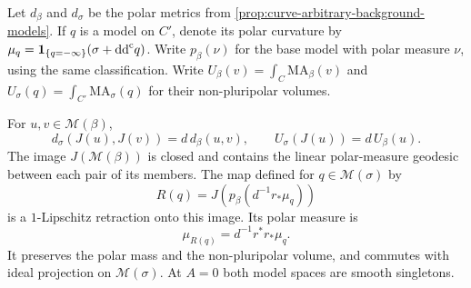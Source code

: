 Let $d_\beta$ and $d_\sigma$ be the polar metrics from
\cref{prop:curve-arbitrary-background-models}. If $q$ is a model
on $C'$, denote its polar curvature by
$\mu_q=\mathbf1_{\{q=-\infty\}}(\sigma+\mathrm{dd}^{\mathrm{c}} q)$.
Write $p_\beta(\nu)$ for the base model with polar measure
$\nu$, using the same classification.
Write $U_\beta(v)=\int_C\mathrm{MA}_\beta(v)$ and
$U_\sigma(q)=\int_{C'}\mathrm{MA}_\sigma(q)$ for their
non-pluripolar volumes.

\begin{proposition}\label{finite-curve:model-retraction}
For $u,v\in\mathcal M(\beta)$,
\[
 d_\sigma(J(u),J(v))=d\,d_\beta(u,v),\qquad
 U_\sigma(J(u))=d\,U_\beta(u).
\]
The image $J(\mathcal M(\beta))$ is closed and contains the
linear polar-measure geodesic between each pair of its members.
The map defined for $q\in\mathcal M(\sigma)$ by
\[
 R(q)=J\!\left(p_\beta\!\left(d^{-1}r_*\mu_q\right)\right)
\]
is a $1$-Lipschitz retraction onto this image. Its polar measure is
\[
 \mu_{R(q)}=d^{-1}r^*r_*\mu_q.
\]
It preserves the polar mass and the non-pluripolar volume,
and commutes with ideal projection on $\mathcal M(\sigma)$.
At $A=0$ both model spaces are smooth singletons.
\end{proposition}
